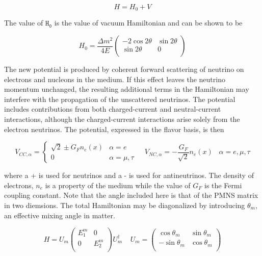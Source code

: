 \begin{equation}
H = H_0 + V
\end{equation}

The value of $\mathtt{H_0}$ is the value of vacuum Hamiltonian and can be shown \cite{Review-PMNS} to be

\begin{equation}
H_0 = \frac{\Delta m^2}{4E}
\begin{pmatrix}
- 2 \cos 2 \theta & \sin 2 \theta \\
\sin 2 \theta & 0 \\
\end{pmatrix}
\end{equation}

The new potential is produced by coherent forward scattering of neutrino on electrons and nucleons in the medium.
If this effect leaves the neutrino momentum unchanged, the resulting additional terms in the Hamiltonian may interfere with the propagation of the unscattered neutrinos.
The potential includes contributions from both charged-current and neutral-current interactions, although the charged-current interactions arise solely from the electron neutrinos.
The potential, expressed in the flavor basis, is then

\begin{equation}
V_{CC,\alpha} = 
\begin{cases}
\sqrt{2} \pm G_F n_e \left( x\right) & \alpha = e \\
0 & \alpha = \mu, \tau
\end{cases}\ \ \ \ \ 
V_{NC,\alpha} = -\frac{G_F}{\sqrt{2}} n_e\left(x\right)\;\;\; \alpha = e, \mu, \tau
\end{equation}

where a + is used for neutrinos and a - is used for antineutrinos.
The density of electrons, $n_e$ is a property of the medium while the value of $G_F$ is the Fermi coupling constant.
Note that the angle included here is that of the PMNS matrix in two diemsions.
The total Hamiltonian may be diagonalized by introducing $\theta_m$, an effective mixing angle in matter.

\begin{equation}
H = U_m 
\begin{pmatrix}
E_1^m & 0 \\
0 & E_2^m \\
\end{pmatrix}
U_m^\dagger \ \ \ \ \ 
U_m = \begin{pmatrix}
\cos \theta_m & \sin \theta_m \\
-\sin \theta_m & \cos \theta_m \\
\end{pmatrix}
\end{equation}

